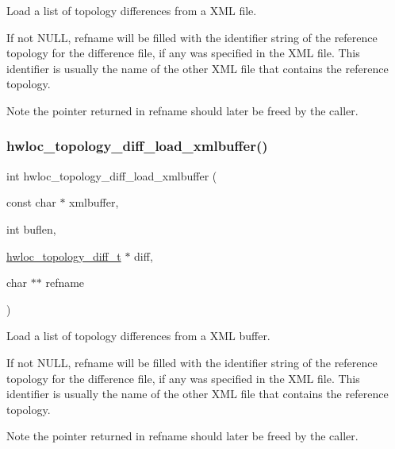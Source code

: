Load a list of topology differences from a X\+ML file. 

If not {\ttfamily N\+U\+LL}, {\ttfamily refname} will be filled with the identifier string of the reference topology for the difference file, if any was specified in the X\+ML file. This identifier is usually the name of the other X\+ML file that contains the reference topology.

\begin{DoxyNote}{Note}
the pointer returned in refname should later be freed by the caller. 
\end{DoxyNote}
\mbox{\label{a00225_gad693810a5c51628529b9dd56f040fb81}} 
\subsubsection{\texorpdfstring{hwloc\+\_\+topology\+\_\+diff\+\_\+load\+\_\+xmlbuffer()}{hwloc\_topology\_diff\_load\_xmlbuffer()}}
{\footnotesize\ttfamily int hwloc\+\_\+topology\+\_\+diff\+\_\+load\+\_\+xmlbuffer (\begin{DoxyParamCaption}\item[{const char $\ast$}]{xmlbuffer,  }\item[{int}]{buflen,  }\item[{\hyperlink{a00225_ga2cf1b17332fe5d95f2198f6340cfd288}{hwloc\+\_\+topology\+\_\+diff\+\_\+t} $\ast$}]{diff,  }\item[{char $\ast$$\ast$}]{refname }\end{DoxyParamCaption})}



Load a list of topology differences from a X\+ML buffer. 

If not {\ttfamily N\+U\+LL}, {\ttfamily refname} will be filled with the identifier string of the reference topology for the difference file, if any was specified in the X\+ML file. This identifier is usually the name of the other X\+ML file that contains the reference topology.

\begin{DoxyNote}{Note}
the pointer returned in refname should later be freed by the caller. 
\end{DoxyNote}

